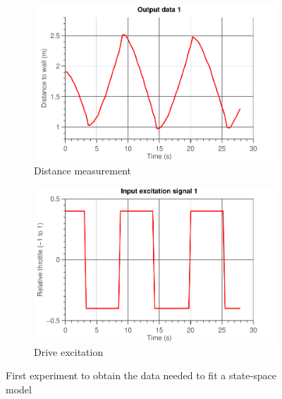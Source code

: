 \documentclass[11pt,titlepage]{report}
\begin{document}
\begin{figure}[H]
	\begin{subfigure}{.5\textwidth}
		\begin{center}
			\includegraphics[width=\linewidth]{resource/distances1.pdf}
		\end{center}
		\caption{Distance measurement}
		\label{fig:ass-1-dist-1}
	\end{subfigure}
	\begin{subfigure}{.5\textwidth}
		\begin{center}
			\includegraphics[width=\linewidth]{resource/drive-excitation1.pdf}
		\end{center}
		\caption{Drive excitation}
		\label{fig:ass-1-drive-1}
	\end{subfigure}
	\caption{First experiment to obtain the data needed to fit a state-space model}
	\label{fig:ass-1-exp-1}
\end{figure}
\end{document}
